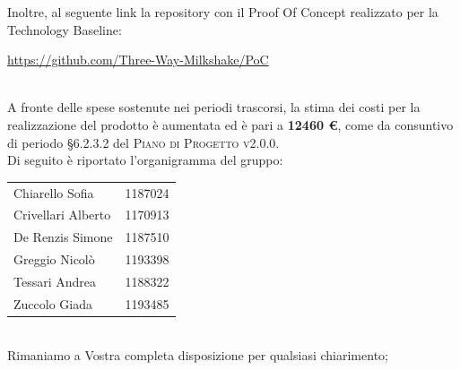 \documentclass[10pt,stdletter,dateno,sigright]{newlfm}  %
\begin{document}
\begin{newlfm}
        
        Inoltre, al seguente link la repository con il Proof Of Concept realizzato per la Technology Baseline:
        \begin{center}
        	\url{https://github.com/Three-Way-Milkshake/PoC}
        \end{center}
        \ \\
        A fronte delle spese sostenute nei periodi trascorsi, la stima dei costi per la realizzazione del prodotto è aumentata ed è pari a \textbf{12460 \euro}, come da consuntivo di periodo \S 6.2.3.2 del \textsc{Piano di Progetto v2.0.0}.
        \\

        Di seguito \`e riportato l'organigramma del gruppo:
        \begin{center}
            \begin{tabular}{l | l}
                Chiarello Sofia & 1187024
                \\
                Crivellari Alberto & 1170913
                \\
                De Renzis Simone & 1187510
                \\
                Greggio Nicolò & 1193398
                \\
                Tessari Andrea & 1188322
                \\
                Zuccolo Giada & 1193485
                \\
            \end{tabular}
        \end{center}
        \ \newline
        \\Rimaniamo a Vostra completa disposizione per qualsiasi chiarimento;

    \end{newlfm}
\end{document}
